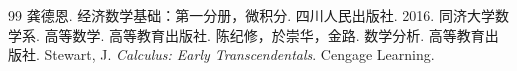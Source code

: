 \documentclass[fontset=fandol]{ctexart}
\begin{document}
\clearpage
\renewcommand{\refname}{References}
\begin{thebibliography}{99}
 龚德恩. 经济数学基础：第一分册，微积分. 四川人民出版社. 2016.
 同济大学数学系. 高等数学. 高等教育出版社.
 陈纪修，於崇华，金路. 数学分析. 高等教育出版社.
 Stewart, J. \emph{Calculus: Early Transcendentals}. Cengage Learning.
\end{thebibliography}
\end{document}
